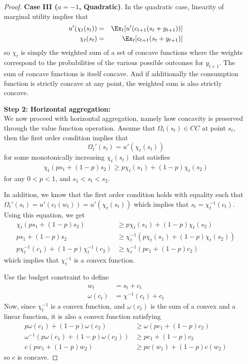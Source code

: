 \documentclass[titlepage]{\econtex}
\providecommand{\wAlt}{\omega}
\begin{document}
\begin{proof}
    \bigskip
    \noindent \textbf{Case III ($a = -1$, Quadratic)}.
    In the quadratic case, linearity of marginal utility implies that
    \begin{eqnarray*}
      u'(\chi_{t}(s_{t})) & = & \Ex_{t}[u'(c_{t+1}(s_{t}+{y}_{t+1}))]
      \\   \chi_{t}(s_{t}) & = & \Ex_{t}[c_{t+1}(s_{t}+{y}_{t+1})]
    \end{eqnarray*}
    so $\chi_{t}$ is simply the weighted sum of a set of
    concave functions where the weights correspond to the probabilities of the various possible outcomes for ${y}_{t+1}$. The sum of concave functions is itself concave. And if additionally the consumption function is strictly concave at any point, the weighted sum is also strictly concave.
    
    
    \bigskip
    \noindent \textbf{Step 2: Horizontal aggregation:} \\
    We now proceed with horizontal aggregation, namely how concavity is preserved through the value function operation. Assume that $\Omega_t(s_t) \in CC$ at point $s_t$, then the first order condition implies that
    \[\Omega_t'(s_t) = u'(\chi_t(s_t))\]
    for some monotonically increasing $\chi_t(s_t)$ that satisfies
    \begin{align}
      \chi_t(ps_1 + (1-p)s_2) \geq p\chi_t(s_1) + (1-p)\chi_t(s_2) \label{eq:hor_conc}
    \end{align}
    for any $0 < p < 1$, and $s_1 < s_t < s_2$. %
    
    In addition, we know that the first order condition holds with equality such that $\Omega_t'(s_t) = u'(c_t(w_t)) = u'(\chi_t(s_t))$ which implies that $s_t = \chi_t^{-1}(c_t)$. Using this equation, we get
    \begin{align*}
      \chi_t(ps_1 + (1-p)s_2) &\geq p\chi_t(s_1) + (1-p)\chi_t(s_2) \\
      ps_1 + (1-p)s_2 &\geq \chi_t^{-1}(p\chi_t(s_1) + (1-p)\chi_t(s_2)) \\
      p\chi_t^{-1}(c_1) + (1-p)\chi_t^{-1}(c_2) &\geq \chi_t^{-1}(pc_1 + (1-p)c_2)
    \end{align*}
    which implies that $\chi_t^{-1}$ is a convex function. 
    
    Use the budget constraint to define
    \begin{align*}
      w_t &= s_t + c_t \\ 
      \wAlt(c_t) & = \chi^{-1}(c_t) + c_t
    \end{align*} 
    Now, since $\chi_t^{-1}$ is a convex function, and $\wAlt(c_t)$ is the sum of a convex and a linear function, it is also a convex function satisfying
    \begin{align}
      p\wAlt(c_1) + (1-p)\wAlt(c_2) &\geq \wAlt(pc_1 + (1-p)c_2) \nonumber \\
      \wAlt^{-1}(p\wAlt(c_1) + (1-p)\wAlt(c_2)) &\geq pc_1 + (1-p)c_2 \nonumber \\
      c(pw_1 + (1-p)w_2) &\geq pc(w_1) + (1-p)c(w_2) \label{eq:hor_conc2}
    \end{align} 
    so $c$ is concave. 
    

\end{proof}
\end{document}
